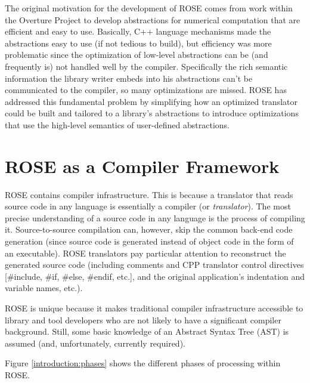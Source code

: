    The original motivation for the development of ROSE comes from work within the Overture Project
to develop abstractions for numerical computation that are efficient and easy to use.
Basically, C++ language mechanisms made the abstractions easy to use (if not tedious to
build), but efficiency was more problematic since the optimization of low-level
abstractions can be (and frequently is) not handled well by the compiler.  Specifically
the rich semantic information the library writer embeds into his abstractions can't
be communicated to the compiler, so many optimizations are missed.  ROSE has addressed
this fundamental problem by simplifying how an optimized translator could be built and
tailored to a library's abstractions to introduce optimizations that use the high-level 
semantics of user-defined abstractions.

\section{ROSE as a Compiler Framework}

    ROSE contains compiler infrastructure. This is because a translator that reads
source code in any language is essentially a compiler (or {\em translator}).  The most precise understanding
of a source code in any language is the process of compiling it.  Source-to-source
compilation can, however, skip the common back-end code generation (since source code is
generated instead of object code in the form of an executable).  ROSE translators
pay particular attention to reconstruct the generated source code (including comments and
CPP translator control directives [\#include, \#if, \#else, \#endif, etc.], and 
the original application's indentation and variable names, etc.).

    ROSE is unique because 
it makes traditional compiler infrastructure
accessible to library and tool developers who are not likely to have a significant compiler
background.  Still, some basic knowledge of an Abstract Syntax Tree (AST) is 
assumed (and, unfortunately, currently required).  

   Figure \ref{introduction:phases} shows the different phases of processing within ROSE.

